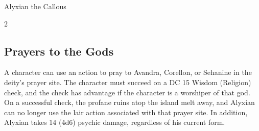 \documentclass[10pt,a4paper,twoside,bg=none,twocolumn,openany,nodeprecatedcode]{dndbook}
\begin{document}
\begin{DndMonster}[float*=b,width=\textwidth + 8pt]{Alyxian the Callous}
\begin{multicols}{2}
\begin{description}[nolistsep]
\end{description}

\subsection{Prayers to the Gods}
A character can use an action to pray to Avandra, Corellon, or Sehanine in the deity's prayer site. The character must succeed on a DC 15 Wisdom (Religion) check, and the check has advantage if the character is a worshiper of that god. On a successful check, the profane ruins atop the island melt away, and Alyxian can no longer use the lair action associated with that prayer site. In addition, Alyxian takes 14 (4d6) psychic damage, regardless of his current form.

\end{multicols}
\end{DndMonster}
\end{document}
